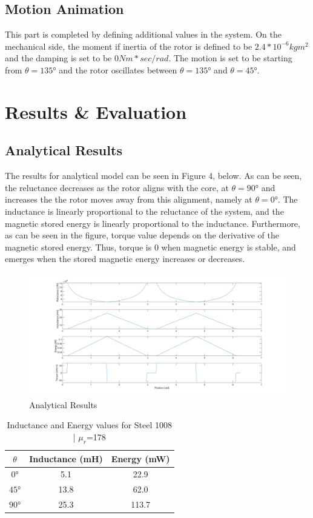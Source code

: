 \documentclass[a4paper, 11pt]{article}
\begin{document}
\subsection{Motion Animation}
This part is completed by defining additional values in the system. On the mechanical side, the moment if inertia of the rotor is defined to be $2.4*10^{-6} kgm^2$ and the damping is set to be $0 Nm*sec/rad$. The motion is set to be starting from $\theta=\ang{135}$ and the rotor oscillates between $\theta=\ang{135}$ and $\theta=\ang{45}$.
\section{Results \& Evaluation}

\subsection{Analytical Results}

The results for analytical model can be seen in Figure 4, below. As can be seen, the reluctance decreases as the rotor aligns with the core, at $\theta=\ang{90}$ and increases the the rotor moves away from this alignment, namely at $\theta=\ang{0}$. The inductance is linearly proportional to the reluctance of the system, and the magnetic stored energy is linearly proportional to the inductance. Furthermore, as can be seen in the figure, torque value depends on the derivative of the magnetic stored energy. Thus, torque is 0 when magnetic energy is stable, and emerges when the stored magnetic energy increases or decreases.

\begin{figure}[h!]
\centering
\includegraphics[width=1.1\textwidth]{analytical_results.png}
\caption{Analytical Results}
\end{figure}

\begin{table}[htbp]
	\begin{center}
		\begin{tabular}{|c|c|c}
			$\theta$ & Inductance (mH) & Energy (mW)\\
			\hline
			$\ang{0}$ & 5.1 & 22.9\\
			$\ang{45}$ & 13.8 & 62.0\\
			$\ang{90}$ & 25.3& 113.7\\
		\end{tabular}
	\end{center}
	\caption{Inductance and Energy values for Steel 1008 | $\mu_r$=178}
\end{table}
\end{document}
